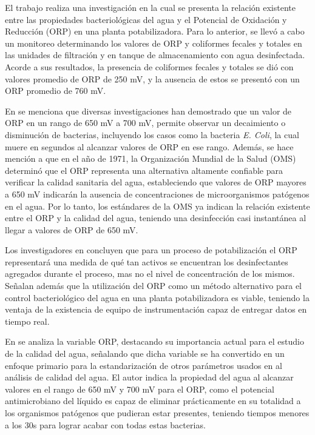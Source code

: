 El trabajo \cite{merida_cano_calidad_2020} realiza una investigación en la cual se presenta
la relación existente entre las propiedades bacteriológicas del agua y el Potencial de Oxidación y Reducción (ORP) en una planta potabilizadora. Para lo anterior, se llevó a cabo un monitoreo 
determinando los valores de ORP y coliformes fecales y totales en las unidades de filtración y en 
tanque de almacenamiento con agua desinfectada. Acorde a sus resultados, la presencia de coliformes fecales
y totales se dió con valores promedio de ORP de 250 mV, y la ausencia de estos se presentó con un ORP 
promedio de 760 mV.

En \cite{merida_cano_calidad_2020} se menciona que diversas investigaciones han demostrado que un valor de 
ORP en un rango de 650 mV a 700 mV, permite observar un decaimiento o disminución de bacterias, incluyendo
los casos como la bacteria \textit{E. Coli}, la cual muere en segundos al alcanzar valores de ORP en ese rango. Además,
se hace mención a que en el año de 1971, la Organización Mundial de la Salud (OMS) determinó que el ORP representa 
una alternativa altamente confiable para verificar la calidad sanitaria del agua, estableciendo que 
valores de ORP mayores a 650 mV indicarán la ausencia de concentraciones de microorganismos patógenos en el 
agua. Por lo tanto, los estándares de la OMS ya indican la relación existente entre el ORP y la calidad del agua, 
teniendo una desinfección casi instantánea al llegar a valores de ORP de 650 mV.

Los investigadores en \cite{merida_cano_calidad_2020} concluyen que para un proceso de potabilización
el ORP representará una medida de qué tan activos se encuentran los desinfectantes agregados durante el proceso,
mas no el nivel de concentración de los mismos. Señalan además que la 
utilización del ORP como un método alternativo para el control bacteriológico del agua en una planta potabilizadora es
viable, teniendo la ventaja de la existencia de equipo de instrumentación capaz de entregar datos en tiempo real.

En \cite{suslow_oxidation-reduction_2004} se analiza la variable ORP, destacando su importancia actual para el estudio
de la calidad del agua, señalando que dicha variable se ha convertido en un enfoque primario para la estandarización 
de otros parámetros usados en al análisis de calidad del agua. El autor indica la propiedad del agua al alcanzar valores 
en el rango de 650 mV y 700 mV para el ORP, como el potencial antimicrobiano del líquido es capaz de eliminar prácticamente en 
su totalidad a los organismos patógenos que pudieran estar presentes, teniendo tiempos menores a los 30s para lograr 
acabar con todas estas bacterias.

